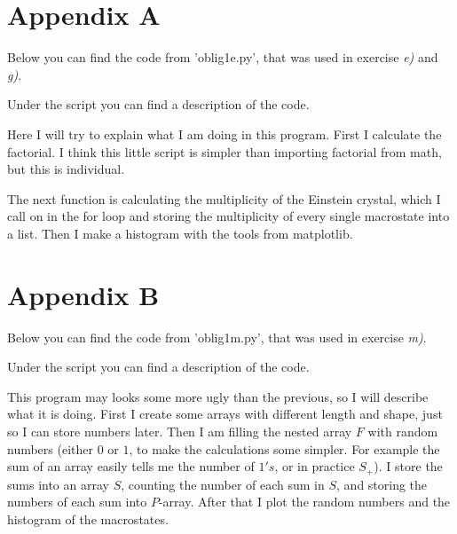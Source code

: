 \documentclass{scrartcl}
\begin{document}
\section{Appendix A}
Below you can find the code from 'oblig1e.py', that was used in exercise \textit{e)} and \textit{g)}.\par\vspace{3mm} Under the script you can find a description of the code.

Here I will try to explain what I am doing in this program. First I calculate the factorial. I think this little script is simpler than importing factorial from math, but this is individual.\par\vspace{3mm}
The next function is calculating the multiplicity of the Einstein crystal, which I call on in the for loop and storing the multiplicity of every single macrostate into a list. Then I make a histogram with the tools from matplotlib.

\section{Appendix B}
Below you can find the code from 'oblig1m.py', that was used in exercise \textit{m)}.\par\vspace{3mm} Under the script you can find a description of the code.

This program may looks some more ugly than the previous, so I will describe what it is doing. First I create some arrays with different length and shape, just so I can store numbers later. Then I am filling the nested array $F$ with random numbers (either $0$ or $1$, to make the calculations some simpler. For example the sum of an array easily tells me the number of $1's$, or in practice $S_+$). I store the sums into an array $S$, counting the number of each sum in $S$, and storing the numbers of each sum into $P$-array. After that I plot the random numbers and the histogram of the macrostates.  

\end{document}
